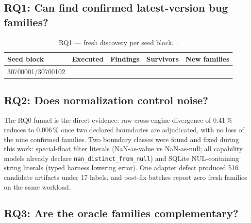 \subsection{RQ1: Can \sys{} find confirmed latest-version bug families?}


\begin{table}[t]
\caption{RQ1 — fresh discovery per seed block. .}
\label{tab:rq1}
\small
\begin{tabular}{@{}lrrrr@{}}
\toprule
Seed block & Executed & Findings & Survivors & New families \\
\midrule
30700001/30700102 & \todo{} & \todo{} & \todo{} & \todo{} \\
\bottomrule
\end{tabular}
\end{table}

\subsection{RQ2: Does normalization control noise?}

The RQ0 funnel is the direct evidence: raw cross-engine divergence of 0.41\,\% reduces to
0.006\,\% once two declared boundaries are adjudicated, with no loss of the nine confirmed
families. Two boundary classes were found and fixed during this work: special-float filter
literals (NaN-as-value vs NaN-as-null; all capability models already declare
\texttt{nan\_distinct\_from\_null}) and SQLite NUL-containing string literals (typed harness
lowering error). One adapter defect produced 516 candidate artifacts under 17 labels, and
post-fix batches report zero fresh families on the same workload. 

\subsection{RQ3: Are the oracle families complementary?}


